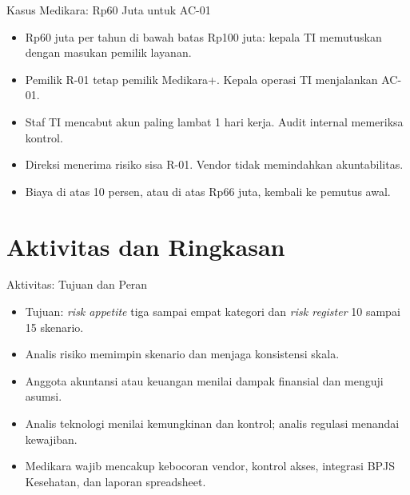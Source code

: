\documentclass[aspectratio=169, table, 12pt]{beamer}
\begin{document}
\begin{frame}{{\Large Kasus Medikara: Rp60 Juta untuk AC-01}}
  \vspace{6pt}
  \small
  \begin{itemize}
    \item Rp60 juta per tahun di bawah batas Rp100 juta: kepala TI memutuskan dengan masukan pemilik
          layanan.
    \item Pemilik R-01 tetap pemilik Medikara+. Kepala operasi TI menjalankan AC-01.
    \item Staf TI mencabut akun paling lambat 1 hari kerja. Audit internal memeriksa kontrol.
    \item Direksi menerima risiko sisa R-01. Vendor tidak memindahkan akuntabilitas.
    \item Biaya di atas 10 persen, atau di atas Rp66 juta, kembali ke pemutus awal.
  \end{itemize}
\end{frame}

\section{Aktivitas dan Ringkasan}

\begin{frame}{{\Large Aktivitas: Tujuan dan Peran}}
  \vspace{6pt}
  \small
  \begin{itemize}
    \item Tujuan: \textit{risk appetite} tiga sampai empat kategori dan \textit{risk register} 10
          sampai 15 skenario.
    \item Analis risiko memimpin skenario dan menjaga konsistensi skala.
    \item Anggota akuntansi atau keuangan menilai dampak finansial dan menguji asumsi.
    \item Analis teknologi menilai kemungkinan dan kontrol; analis regulasi menandai kewajiban.
    \item Medikara wajib mencakup kebocoran vendor, kontrol akses, integrasi BPJS Kesehatan, dan
          laporan spreadsheet.
  \end{itemize}
\end{frame}
\end{document}
